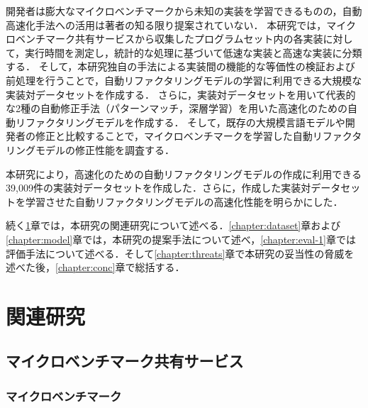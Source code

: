 \documentclass[11pt]{jreport}
\newcommand{\fix}[1]{#1}
\begin{document}
開発者は膨大なマイクロベンチマークから未知の実装を学習できるものの，自動高速化手法への活用は著者の知る限り提案されていない．
本研究では，マイクロベンチマーク共有サービスから収集したプログラムセット内の各実装に対して，実行時間を測定し，統計的な処理に基づいて低速な実装と高速な実装に分類する．
そして，本研究独自の手法による実装間の機能的な等価性の検証および前処理を行うことで，自動リファクタリングモデルの学習に利用できる大規模な実装対データセットを作成する．
さらに，実装対データセットを用いて代表的な2種の自動修正手法（パターンマッチ，深層学習）を用いた高速化のための自動リファクタリングモデルを作成する．
そして，既存の大規模言語モデルや開発者の修正と比較することで，マイクロベンチマークを学習した自動リファクタリングモデルの修正性能を調査する．

本研究により，高速化のための自動リファクタリングモデルの作成に利用できる39,009件の実装対データセットを作成した\fix{．さらに}，作成した実装対データセットを学習させた自動リファクタリングモデルの高速化性能を明らかにした．

続く\ref{chapter:related-work}章では，本研究の関連研究について述べる．\ref{chapter:dataset}章および\ref{chapter:model}章では，本研究の提案手法について述べ，\ref{chapter:eval-1}章では評価手法について述べる．そして\ref{chapter:threats}章で本研究の妥当性の脅威を述べた後，\ref{chapter:conc}章で総括する．




\chapter{関連研究}\label{chapter:related-work}




\section{マイクロベンチマーク共有サービス}




\subsection{マイクロベンチマーク}
\end{document}
